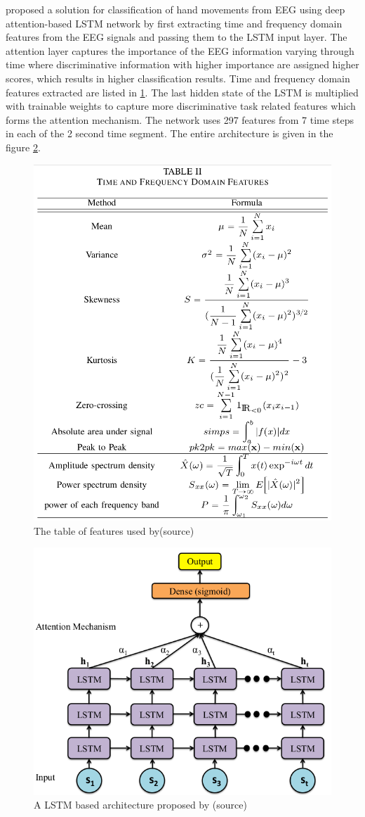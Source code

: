 \cite{2019_DLSTM_MI} proposed a solution for classification of hand movements from EEG using deep attention-based LSTM network by first extracting time and frequency domain features from the EEG signals and passing them to the LSTM input layer. The attention layer captures the importance of the EEG information varying through time where discriminative information with higher importance are assigned higher scores, which results in higher classification results. Time and frequency domain features extracted are listed in \ref{fig:2019_DLSTM_MI_Table2}. The last hidden state of the LSTM is multiplied with trainable weights to capture more discriminative task related features which forms the attention mechanism. The network uses 297 features from 7 time steps in each of the 2 second time segment. The entire architecture is given in the figure \ref{fig:2019_DLSTM_MI_arc}. 
    \begin{figure}[h] 
        \includegraphics[height=0.6\textwidth]{images/2019_DLSTM_MI_Table2.png}
        \caption{The table of features used by\cite{2019_DLSTM_MI}(source)}
        \label{fig:2019_DLSTM_MI_Table2}
    \end{figure}

    \begin{figure}[h] 
        \includegraphics[height=0.6\textwidth]{images/2019_DLSTM_MI_arc.png}
        \caption{A LSTM based architecture proposed by \cite{2019_DLSTM_MI}(source)}
        \label{fig:2019_DLSTM_MI_arc}
    \end{figure}

